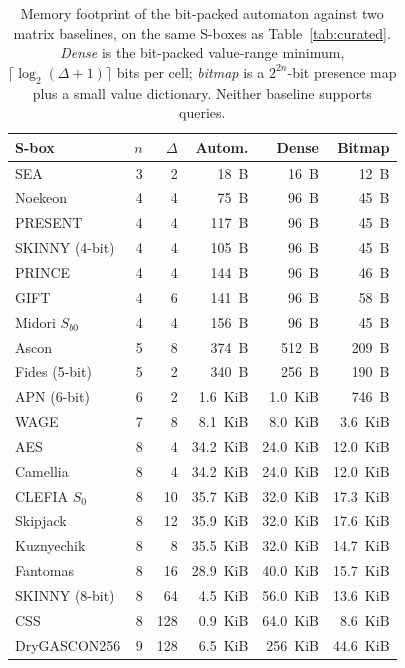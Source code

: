 \documentclass[runningheads]{llncs}
\begin{document}
\begin{table}[t]
\centering
\caption{Memory footprint of the bit-packed automaton against two matrix
baselines, on the same S-boxes as Table~\ref{tab:curated}. \emph{Dense} is the
bit-packed value-range minimum, $\lceil\log_2(\Delta+1)\rceil$ bits per cell;
\emph{bitmap} is a $2^{2n}$-bit presence map plus a small value dictionary.
Neither baseline supports queries.}
\label{tab:memory}
\small
\begin{tabular}{l r r r r r}
\toprule
S-box & $n$ & $\Delta$ & Autom. & Dense & Bitmap\\
\midrule
SEA            & 3 & 2   &     18~B  &     16~B  &     12~B \\
Noekeon        & 4 & 4   &     75~B  &     96~B  &     45~B \\
PRESENT        & 4 & 4   &    117~B  &     96~B  &     45~B \\
SKINNY (4-bit) & 4 & 4   &    105~B  &     96~B  &     45~B \\
PRINCE         & 4 & 4   &    144~B  &     96~B  &     46~B \\
GIFT           & 4 & 6   &    141~B  &     96~B  &     58~B \\
Midori $S_{b0}$& 4 & 4   &    156~B  &     96~B  &     45~B \\
Ascon          & 5 & 8   &    374~B  &    512~B  &    209~B \\
Fides (5-bit)  & 5 & 2   &    340~B  &    256~B  &    190~B \\
APN (6-bit)    & 6 & 2   &  1.6~KiB  &  1.0~KiB  &    746~B \\
WAGE           & 7 & 8   &  8.1~KiB  &  8.0~KiB  &  3.6~KiB \\
AES            & 8 & 4   & 34.2~KiB  & 24.0~KiB  & 12.0~KiB \\
Camellia       & 8 & 4   & 34.2~KiB  & 24.0~KiB  & 12.0~KiB \\
CLEFIA $S_0$   & 8 & 10  & 35.7~KiB  & 32.0~KiB  & 17.3~KiB \\
Skipjack       & 8 & 12  & 35.9~KiB  & 32.0~KiB  & 17.6~KiB \\
Kuznyechik     & 8 & 8   & 35.5~KiB  & 32.0~KiB  & 14.7~KiB \\
Fantomas       & 8 & 16  & 28.9~KiB  & 40.0~KiB  & 15.7~KiB \\
SKINNY (8-bit) & 8 & 64  &  4.5~KiB  & 56.0~KiB  & 13.6~KiB \\
CSS            & 8 & 128 &  0.9~KiB  & 64.0~KiB  &  8.6~KiB \\
DryGASCON256   & 9 & 128 &  6.5~KiB  &   256~KiB & 44.6~KiB \\
\bottomrule
\end{tabular}
\end{table}
\end{document}
